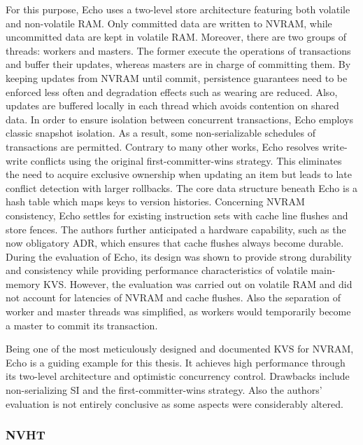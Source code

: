 For this purpose, Echo uses a two-level store architecture featuring both
volatile and non-volatile RAM. Only committed data are written to NVRAM, while
uncommitted data are kept in volatile RAM. Moreover, there are two groups of
threads: workers and masters. The former execute the operations of transactions
and buffer their updates, whereas masters are in charge of committing them. By
keeping updates from NVRAM until commit, persistence guarantees need to be
enforced less often and degradation effects such as wearing are reduced. Also,
updates are buffered locally in each thread which avoids contention on shared
data. In order to ensure isolation between concurrent transactions, Echo employs
classic snapshot isolation. As a result, some non-serializable schedules of
transactions are permitted. Contrary to many other works, Echo resolves
write-write conflicts using the original first-committer-wins strategy. This
eliminates the need to acquire exclusive ownership when updating an item but
leads to late conflict detection with larger rollbacks. The core data structure
beneath Echo is a hash table which maps keys to version histories. Concerning
NVRAM consistency, Echo settles for existing instruction sets with cache line
flushes and store fences. The authors further anticipated a hardware capability,
such as the now obligatory ADR, which ensures that cache flushes always become
durable. During the evaluation of Echo, its design was shown to provide strong
durability and consistency while providing performance characteristics of
volatile main-memory KVS. However, the evaluation was carried out on volatile
RAM and did not account for latencies of NVRAM and cache flushes. Also the
separation of worker and master threads was simplified, as workers would
temporarily become a master to commit its transaction.

Being one of the most meticulously designed and documented KVS for NVRAM, Echo
is a guiding example for this thesis. It achieves high performance through its
two-level architecture and optimistic concurrency control. Drawbacks include
non-serializing SI and the first-committer-wins strategy. Also the authors'
evaluation is not entirely conclusive as some aspects were considerably altered.

\subsubsection{NVHT}

